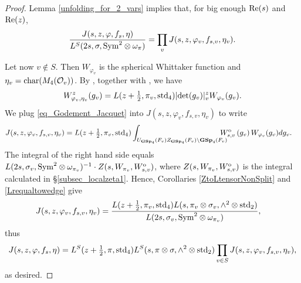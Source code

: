 \documentclass[11pt, reqno]{amsart}
\theoremstyle{plain}
\theoremstyle{definition}
\theoremstyle{remark}
\theoremstyle{plain}
\def\GSp{{\mathbf{GSp}}}
\begin{document}
\begin{proof}
 

Lemma \ref{unfolding_for_2_vars} implies that, for big enough ${\rm Re}(s)$ and ${\rm Re}(z)$, \[\frac{J(s,z,\varphi,f_s, \eta)}{L^S(2s, \sigma, {\rm Sym}^2 \otimes \omega_\pi)} = \prod_v J(s,z,\varphi_v,f_{s,v},\eta_v).\] 

Let now $v \not \in S$. Then $W_{\varphi_v}$ is the spherical Whittaker function and $\eta_v = {\rm char}(M_4(\mathcal{O}_v))$. By \cite[Lemma 6.10]{GodementJacquet}, together with \cite[(1.5) \& (2.1)]{Watanabe:Global:Theta}, we have 
\begin{align}\label{eq_Godement_Jacquet}
W_{\varphi_v,\eta_v}^z(g_v) = L(z + \tfrac{1}{2}, \pi_v,{\rm std}_4)   | {\rm det}(g_v)|_v^{z}  W_{\varphi_v}(g_v).
\end{align}
We plug \eqref{eq_Godement_Jacquet} into $J(s,z,\varphi_v,f_{s,v},\eta_v)$ to write 
\begin{align*}
    J(s,z,\varphi_v,f_{s,v},\eta_v) &= L(z+ \tfrac{1}{2},\pi_v,{\rm std}_4) \int_{U_{\GSp_4}(F_v)Z_{\GSp_4}(F_v)\setminus {\GSp_4}(F_v)} \!\!\!\!\!\!\!W_{s,v}^{\rm o}\left(g_v\right)W_{\varphi_v}(g_v)dg_v.
    \end{align*}
The integral of the right hand side equals $L(2s, \sigma_v, {\rm Sym}^2\otimes \omega_{\pi_v} )^{-1} \cdot Z(s,W_{\pi_v},W_{s,v}^{\rm o})$, where $Z(s,W_{\pi_v},W_{s,v}^{\rm o})$ is the integral calculated in \S \ref{subsec_localzeta1}. Hence,  Corollaries \ref{ZtoLtensorNonSplit} and \ref{Lrequaltowedge} give 
\begin{align*}
    J(s,z,\varphi_v,f_{s,v},\eta_v) &= \frac{L(z+ \tfrac{1}{2},\pi_v,{\rm std}_4)L(s,\pi_v\otimes \sigma_v,\wedge^2 \otimes \mathrm{std}_2)}{L(2s, \sigma_v, {\rm Sym}^2\otimes \omega_{\pi_v} )}, 
    \end{align*}
    thus 
     \[ J(s,z,\varphi,f_s, \eta) =L^S(z+ \tfrac{1}{2},\pi,{\rm std}_4)L^S(s,\pi \otimes \sigma,\wedge^2 \otimes \mathrm{std}_2) \prod_{v \in S} J(s,z,\varphi_v,f_{s,v},\eta_v),\]
     as desired.
\end{proof}
\end{document}
